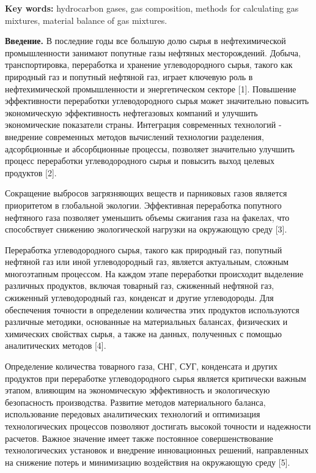 {\bfseries Key words:} hydrocarbon gases, gas composition, methods for
calculating gas mixtures, material balance of gas mixtures.

{\bfseries Введение.} В последние годы все большую долю сырья в
нефтехимической промышленности занимают попутные газы нефтяных
месторождений. Добыча, транспортировка, переработка и хранение
углеводородного сырья, такого как природный газ и попутный нефтяной газ,
играет ключевую роль в нефтехимической промышленности и энергетическом
секторе {[}1{]}. Повышение эффективности переработки углеводородного
сырья может значительно повысить экономическую эффективность
нефтегазовых компаний и улучшить экономические показатели страны.
Интеграция современных технологий - внедрение современных методов
вычислений технологии разделения, адсорбционные и абсорбционные
процессы, позволяет значительно улучшить процесс переработки
углеводородного сырья и повысить выход целевых продуктов {[}2{]}.

Сокращение выбросов загрязняющих веществ и парниковых газов является
приоритетом в глобальной экологии. Эффективная переработка попутного
нефтяного газа позволяет уменьшить объемы сжигания газа на факелах, что
способствует снижению экологической нагрузки на окружающую среду
{[}3{]}.

Переработка углеводородного сырья, такого как природный газ, попутный
нефтяной газ или иной углеводородный газ, является актуальным, сложным
многоэтапным процессом. На каждом этапе переработки происходит выделение
различных продуктов, включая товарный газ, сжиженный нефтяной газ,
сжиженный углеводородный газ, конденсат и другие углеводороды. Для
обеспечения точности в определении количества этих продуктов
используются различные методики, основанные на материальных балансах,
физических и химических свойствах сырья, а также на данных, полученных с
помощью аналитических методов {[}4{]}.

Определение количества товарного газа, СНГ, СУГ, конденсата и других
продуктов при переработке углеводородного сырья является критически
важным этапом, влияющим на экономическую эффективность и экологическую
безопасность производства. Развитие методов материального баланса,
использование передовых аналитических технологий и оптимизация
технологических процессов позволяют достигать высокой точности и
надежности расчетов. Важное значение имеет также постоянное
совершенствование технологических установок и внедрение инновационных
решений, направленных на снижение потерь и минимизацию воздействия на
окружающую среду {[}5{]}.

